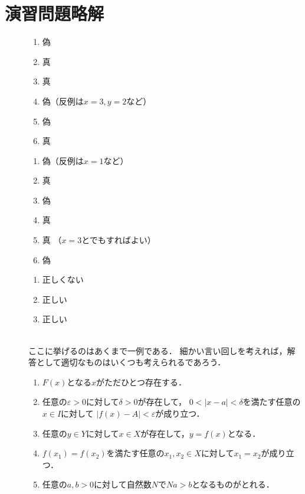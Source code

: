 \chapter{演習問題略解} \label{answer}
\begin{description}
  \item[] \mbox{}
  \begin{enumerate}
   \item 偽
   \item 真
   \item 真
   \item 偽（反例は$x=3,  y=2$など）
   \item 偽
   \item 真
  \end{enumerate}
\item[] \mbox{} 
  \begin{enumerate}
   \item 偽（反例は$x=1$など）
   \item 真
   \item 偽
   \item 真
   \item 真 （$x=3$とでもすればよい）
   \item 偽
  \end{enumerate}
\item[] \mbox{} 
  \begin{enumerate}
   \item 正しくない
   \item 正しい
   \item 正しい
  \end{enumerate}
\item[] \mbox{} \\
  ここに挙げるのはあくまで一例である．
  細かい言い回しを考えれば，解答として適切なものはいくつも考えられるであろう．
  \begin{enumerate}
    \item  $F(x)$となる$x$がただひとつ存在する．
    \item 任意の$\varepsilon >0$に対して$\delta >0$が存在して，
      $0< \lvert x- a \rvert < \delta$を満たす任意の$x \in I$に対して
      $\lvert f(x) -A \rvert < \varepsilon$が成り立つ．
    \item 任意の$y \in Y$に対して$x \in X$が存在して，$y=f(x)$となる．
    \item $f(x_1 )=f(x_2) $を満たす任意の$x_1, x_2 \in X$に対して$x_1 = x_2$が成り立つ．
    \item 任意の$a,b >0$に対して自然数$N$で$Na >b$となるものがとれる．
  \end{enumerate}


\end{description}
